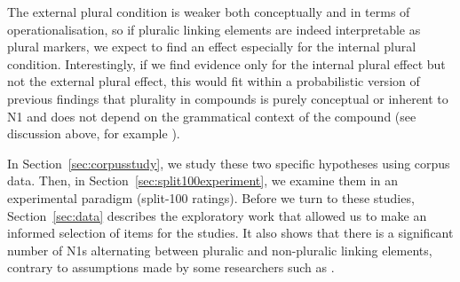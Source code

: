The external plural condition is weaker both conceptually and in terms of operationalisation, so if pluralic linking elements are indeed interpretable as plural markers, we expect to find an effect especially for the internal plural condition.
Interestingly, if we find evidence only for the internal plural effect but not the external plural effect, this would fit within a probabilistic version of previous findings that plurality in compounds is purely conceptual or inherent to N1 and does not depend on the grammatical context of the compound (see discussion above, for example \citealt{Gallmann1998}).

In Section~\ref{sec:corpusstudy}, we study these two specific hypotheses using corpus data.
Then, in Section~\ref{sec:split100experiment}, we examine them in an experimental paradigm (split-100 ratings).
Before we turn to these studies, Section~\ref{sec:data} describes the exploratory work that allowed us to make an informed selection of items for the studies.
It also shows that there is a significant number of N1s alternating between pluralic and non-pluralic linking elements, contrary to assumptions made by some researchers such as \textcite{NeefBorgwaldt2012,Neef2015}.
